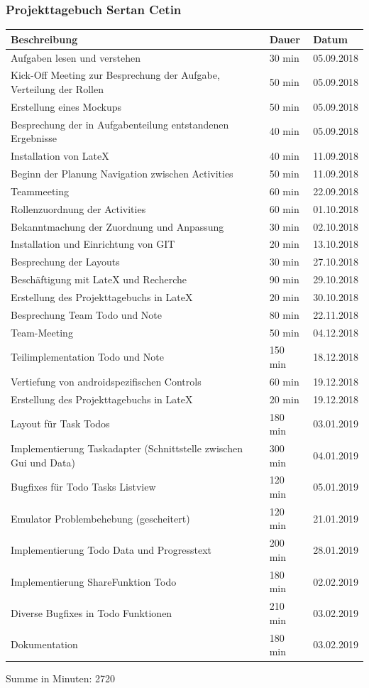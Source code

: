 \subsubsection{Projekttagebuch Sertan Cetin}
\begin{longtable}{|p{10cm}|p{2cm}|p{2cm}|}
\hline
{\textbf{Beschreibung}} & {\textbf{Dauer}} & {\textbf{Datum}} \\ \hline
Aufgaben lesen und verstehen & 30 min & 05.09.2018\\ \hline 
Kick-Off Meeting zur Besprechung der Aufgabe, Verteilung der Rollen & 50 min & 05.09.2018\\ \hline 
Erstellung eines Mockups & 50 min & 05.09.2018\\ \hline 
Besprechung der in Aufgabenteilung entstandenen Ergebnisse & 40 min & 05.09.2018\\ \hline 
Installation von LateX & 40 min & 11.09.2018\\ \hline 
Beginn der Planung Navigation zwischen Activities & 50 min & 11.09.2018\\ \hline 
Teammeeting & 60 min & 22.09.2018\\ \hline 
Rollenzuordnung der Activities & 60 min & 01.10.2018\\ \hline 
Bekanntmachung der Zuordnung und Anpassung & 30 min & 02.10.2018\\ \hline 
Installation und Einrichtung von GIT & 20 min & 13.10.2018\\ \hline 
Besprechung der Layouts & 30 min & 27.10.2018\\ \hline 
Beschäftigung mit LateX und Recherche & 90 min & 29.10.2018\\ \hline 
Erstellung des Projekttagebuchs in LateX & 20 min & 30.10.2018\\ \hline 
Besprechung Team Todo und Note & 80 min & 22.11.2018\\ \hline 
Team-Meeting & 50 min & 04.12.2018\\ \hline 
Teilimplementation Todo und Note & 150 min & 18.12.2018\\ \hline 
Vertiefung von androidspezifischen Controls & 60 min & 19.12.2018\\ \hline 
Erstellung des Projekttagebuchs in LateX & 20 min & 19.12.2018\\ \hline 
Layout für Task Todos & 180 min & 03.01.2019\\ \hline 
Implementierung Taskadapter (Schnittstelle zwischen Gui und Data) & 300 min & 04.01.2019\\ \hline
Bugfixes für Todo Tasks Listview & 120 min & 05.01.2019\\ \hline
Emulator Problembehebung (gescheitert) & 120 min & 21.01.2019\\ \hline 
Implementierung Todo Data und Progresstext & 200 min & 28.01.2019\\ \hline
Implementierung ShareFunktion Todo & 180 min & 02.02.2019\\ \hline
Diverse Bugfixes in Todo Funktionen & 210 min & 03.02.2019\\ \hline
Dokumentation & 180 min & 03.02.2019\\ \hline
\end{longtable}
Summe in Minuten: 2720

